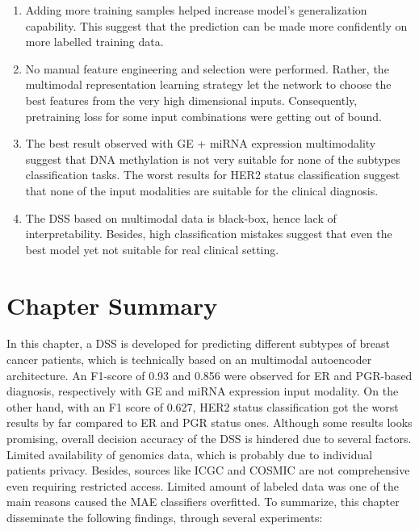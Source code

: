 \begin{enumerate}[noitemsep]
    \item Adding more training samples helped increase model's generalization capability. This suggest that the prediction can be made more confidently on more labelled training data. 
    
    \item No manual feature engineering and selection were performed. Rather, the multimodal representation learning strategy let the network to choose the best features from the very high dimensional inputs. Consequently, pretraining loss for some input combinations were getting out of bound. 

    \item The best result observed with GE + miRNA expression  multimodality suggest that DNA methylation is not very suitable for none of the subtypes classification tasks. The worst results for HER2 status classification suggest that none of the input modalities are suitable for the clinical diagnosis. 
    
    \item The DSS based on multimodal data is black-box, hence lack of interpretability. Besides, high classification mistakes suggest that even the best model yet not suitable for real clinical setting.
\end{enumerate}

\section{Chapter Summary}\label{chapter_4:conclusion}
In this chapter, a DSS is developed for predicting different subtypes of breast cancer patients, which is technically based on an multimodal autoencoder architecture. An F1-score of 0.93 and 0.856 were observed for ER and PGR-based diagnosis, respectively with GE and miRNA expression input modality. On the other hand, with an F1 score of 0.627, HER2 status classification got the worst results by far compared to ER and PGR status ones. Although some results looks promising, overall decision accuracy of the DSS is hindered due to several factors. Limited availability of genomics data, which is probably due to individual patients privacy. Besides, sources like ICGC and COSMIC are not comprehensive even requiring restricted access. Limited amount of labeled data was one of the main reasons caused the MAE classifiers overfitted. To summarize, this chapter disseminate the following findings, through several experiments:  


